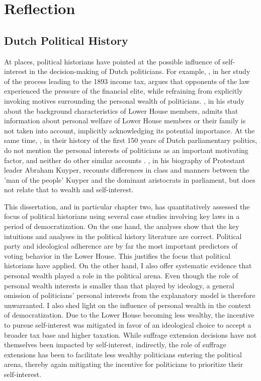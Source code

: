 \section{Reflection}\label{sec:reflection}

\subsection{Dutch Political History}

At places, political historians have pointed at the possible influence of self-interest in the decision-making of Dutch politicians. For example, \cite{smit2002omwille}, in her study of the process leading to the 1893 income tax, argues that opponents of the law experienced the pressure of the financial elite, while refraining from explicitly invoking motives surrounding the personal wealth of politicians. \cite{van1983toegang}, in his study about the background characteristics of Lower House members, admits that information about personal welfare of Lower House members or their family is not taken into account, implicitly acknowledging its potential importance. At the same time, \cite{van2013eerste}, in their history of the first 150 years of Dutch parliamentary politics, do not mention the personal interests of politicians as an important motivating factor, and neither do other similar accounts \cite{de2003het, de2014ons}. \cite{koch2020abraham}, in his biography of Protestant leader Abraham Kuyper, recounts differences in class and manners between the 'man of the people' Kuyper and the dominant aristocrats in parliament, but does not relate that to wealth and self-interest. 

This dissertation, and in particular chapter two, has quantitatively assessed the focus of political historians using several case studies involving key laws in a period of democratization. On the one hand, the analyses show that the key intuitions and analyses in the political history literature are correct. Political party and ideological adherence are by far the most important predictors of voting behavior in the Lower House. This justifies the focus that political historians have applied. On the other hand, I also offer systematic evidence that personal wealth played a role in the political arena. Even though the role of personal wealth interests is smaller than that played by ideology, a general omission of politicians' personal interests from the explanatory model is therefore unwarranted. I also shed light on the influence of personal wealth in the context of democratization. Due to the Lower House becoming less wealthy, the incentive to pursue self-interest was mitigated in favor of an ideological choice to accept a broader tax base and higher taxation. While suffrage extension decisions have not themselves been impacted by self-interest, indirectly, the role of suffrage extensions has been to facilitate less wealthy politicians entering the political arena, thereby again mitigating the incentive for politicians to prioritize their self-interest. 

